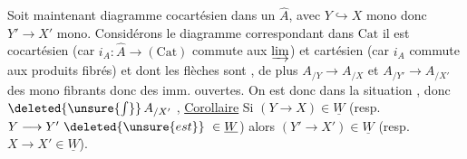 
Soit maintenant
diagramme cocartésien dans un $\widehat A$, avec $Y\hookrightarrow X$ mono donc
$Y'\longrightarrow X'$ mono. 
Considérons le diagramme  correspondant dans $\mathrm{Cat}$
il est cocartésien (car $i_A:\widehat A\longrightarrow(\mathrm{Cat})$ commute aux
$\varinjlim$) et cartésien (car $i_A$ commute aux produits fibrés) et dont les flèches
sont , de plus $A_{/Y}\longrightarrow A_{/X}$ et
$A_{/Y'}\longrightarrow A_{/X'}$  des mono fibrants donc des imm. ouvertes.
On est donc dans la situation , donc
$\deleted{\unsure{\int}}\,A_{/X'}$ 
,
\uline{Corollaire} Si $(Y\longrightarrow X)\in\underline W$
(resp. $Y\longrightarrow Y'\ \deleted{\unsure{est}}\ \in\underline W$)
alors $(Y'\longrightarrow X')\in\underline W$
(resp. $X\longrightarrow X'\in\underline W$).
